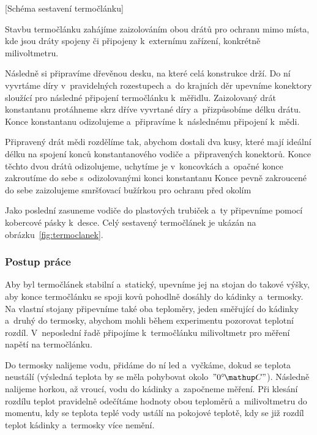 [Schéma sestavení termočlánku]

Stavbu termočlánku zahájíme zaizolováním obou drátů pro ochranu mimo místa, kde
jsou dráty spojeny či připojeny k~externímu zařízení, konkrétně milivoltmetru.

Následně si připravíme dřevěnou desku, na které celá konstrukce drží.
Do ní vyvrtáme díry v~pravidelných rozestupech a~do krajních děr upevníme
konektory sloužící pro následné připojení termočlánku k~měřidlu. Zaizolovaný
drát konstantanu protáhneme skrz dříve vyvrtané díry a~přizpůsobíme
délku drátu. Konce konstantanu odizolujeme a~připravíme k~následnému
připojení k~mědi.

Připravený drát mědi rozdělíme tak, abychom dostali dva kusy, které mají
ideální délku na spojení konců konstantanového vodiče a~připravených konektorů.
Konce těchto dvou drátů odizolujeme, uchytíme je v~koncovkách a~opačné
konce zakroutíme do sebe s~odizolovanými konci konstantanu%
Konce pevně zakroucené do sebe zaizolujeme smršťovací bužírkou pro ochranu
před okolím

Jako poslední zasuneme vodiče do plastových trubiček a~ty připevníme pomocí
kobercové pásky k~desce. Celý sestavený termočlánek je ukázán na
obrázku~\ref{fig:termoclanek}.

\subsubsection{Postup práce}
Aby byl termočlánek stabilní a~statický, upevníme jej na stojan do takové
výšky, aby konce termočlánku se spoji kovů pohodlně dosáhly do kádinky
a~termosky. Na vlastní stojany připevníme také oba teploměry, jeden
směřující do kádinky a~druhý do termosky, abychom mohli během experimentu
pozorovat teplotní rozdíl. V~neposlední řadě připojíme k~termočlánku
milivoltmetr pro měření napětí na termočlánku. 

Do termosky nalijeme vodu, přidáme do ní led a~vyčkáme, dokud se teplota
neustálí (výsledná teplota by se měla pohybovat okolo~$"0 \C"$). Následně
nalijeme horkou, až vroucí, vodu do kádinky a~započneme měření. Při klesání
rozdílu teplot pravidelně odečítáme hodnoty obou teploměrů a~milivoltmetru
do momentu, kdy se teplota teplé vody ustálí na pokojové teplotě, kdy se
již rozdíl teplot kádinky a~termosky více nemění.


